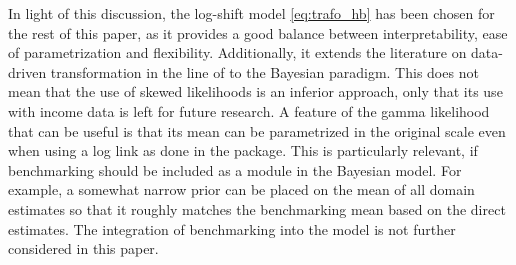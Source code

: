 In light of this discussion, the log-shift model \ref{eq:trafo_hb} has been chosen for the rest of this paper, as it provides a good balance between interpretability, ease of parametrization and flexibility.
Additionally, it extends the literature on data-driven transformation in the line of \cite{rojas_perilla_data_2020} to the Bayesian paradigm.
This does not mean that the use of skewed likelihoods is an inferior approach, only that its use with income data is left for future research.
A feature of the gamma likelihood that can be useful is that its mean can be parametrized in the original scale even when using a log link as done in the  package.
This is particularly relevant, if benchmarking \citep{pfeffermann_new_2013} should be included as a module in the Bayesian model.
For example, a somewhat narrow prior can be placed on the mean of all domain estimates so that it roughly matches the benchmarking mean based on the direct estimates.
The integration of benchmarking into the model is not further considered in this paper.


